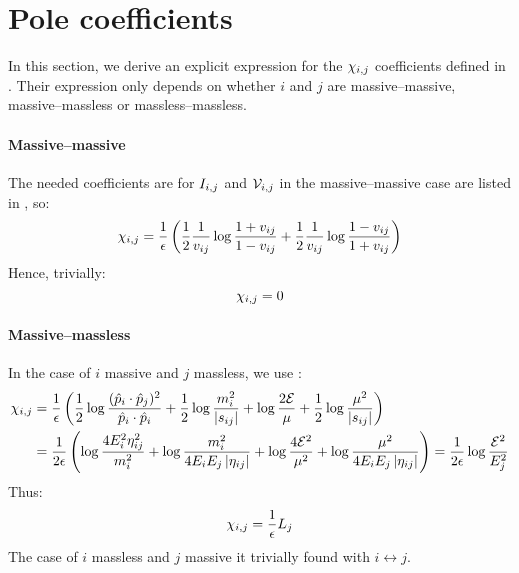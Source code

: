 \section{Pole coefficients}
\label{sec:poles}

In this section, we derive an explicit expression for the $ \chi_{i,j} $ coefficients defined in . Their expression only depends on whether $ i $ and $ j $ are massive--massive, massive--massless or massless--massless.

\paragraph{Massive--massive}

The needed coefficients are for $ I_{i,j} $ and $ \mathcal{V}_{i,j} $ in the massive--massive case are listed in , so:
\begin{equation*}
  \chi_{i,j} = \frac{1}{\epsilon} \left( \frac{1}{2} \frac{1}{v_{ij}} \log \frac{1 + v_{ij}}{1 - v_{ij}} + \frac{1}{2} \frac{1}{v_{ij}} \log \frac{1 - v_{ij}}{1 + v_{ij}} \right)
\end{equation*}
Hence, trivially:
\begin{equation}
  \chi_{i,j} = 0
  \label{eq:ci-mm}
\end{equation}

\paragraph{Massive--massless}

In the case of $ i $ massive and $ j $ massless, we use :
\begin{equation*}
  \begin{split}
    \chi_{i,j}
    & = \frac{1}{\epsilon} \left( \frac{1}{2} \log \frac{(\hat{p}_i \cdot \hat{p}_j)^2}{\hat{p}_i \cdot \hat{p}_i} + \frac{1}{2} \log \frac{m_i^2}{\left\lvert s_{ij}\right\rvert} + \log \frac{2\mathcal{E}}{\mu} + \frac{1}{2} \log \frac{\mu^2}{\left\lvert s_{ij}\right\rvert} \right) \\
    & = \frac{1}{2\epsilon} \left( \log \frac{4 E_i^2 \eta_{ij}^2}{m_i^2} + \log \frac{m_i^2}{4 E_i E_j \left\lvert\eta_{ij}\right\rvert} + \log \frac{4\mathcal{E}^2}{\mu^2} + \log \frac{\mu^2}{4 E_i E_j \left\lvert\eta_{ij}\right\rvert} \right) = \frac{1}{2\epsilon} \log \frac{\mathcal{E}^2}{E_j^2}
  \end{split}
\end{equation*}
Thus:
\begin{equation}
  \chi_{i,j} = \frac{1}{\epsilon} L_j
  \label{eq:ci-mnm}
\end{equation}
The case of $ i $ massless and $ j $ massive it trivially found with $ i \leftrightarrow j $.

